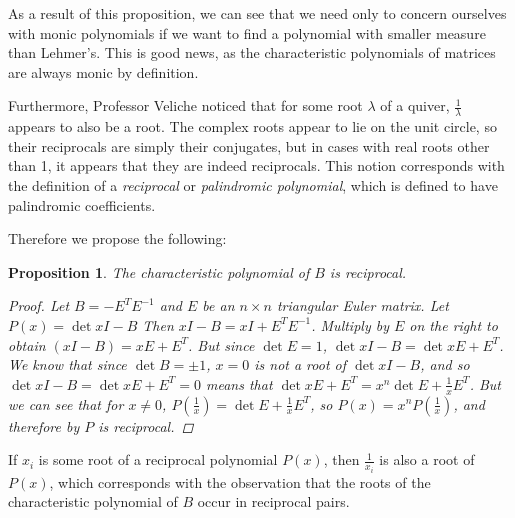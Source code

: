 \documentclass{amsart}
\theoremstyle{theorem}
\theoremstyle{theorem*}
\newtheorem{proposition}[theorem]{Proposition}
\theoremstyle{definition}
\begin{document}
As a result of this proposition, we can see that we need only to concern ourselves with monic polynomials if we
want to find a polynomial with smaller measure than Lehmer's. This is good news, as the characteristic polynomials
of matrices are always monic by definition.

Furthermore, Professor Veliche noticed that for some root $\lambda$ of a quiver,
$\frac{1}{\lambda}$ appears to also be a root. The complex roots appear to lie on
the unit circle, so their reciprocals are simply their conjugates, but in cases with
real roots other than 1, it appears that they are indeed reciprocals. This notion
corresponds with the definition of a \textit{reciprocal} or \textit{palindromic polynomial}, 
which is defined to have palindromic coefficients. 

Therefore we propose the following:

\begin{proposition}
    The characteristic polynomial of $B$ is reciprocal.
    \begin{proof}
        Let $B = - E^T E^{-1}$ and $E$ be an $n \times n$ triangular Euler matrix. Let $P(x) = \det{xI - B}$
        Then $xI - B = xI + E^T E^{-1}$. Multiply by $E$ on the right to obtain
        $(xI - B) = xE + E^T$. But since $\det{E} = 1$, $\det{xI - B} = \det{xE + E^T}$.
        We know that since $\det{B} = \pm 1$, $x = 0$ is not a root of $\det{xI - B}$,
        and so $\det{xI - B} = \det{xE + E^T} = 0$ means that 
        $\det{xE+E^T} = x^n \det{E + \frac{1}{x} E^T}$. But we can see that for $x \neq 0$,
        $P(\frac{1}{x}) = \det{E + \frac{1}{x} E^T}$, so $P(x) = x^n P(\frac{1}{x})$,
        and therefore by \cite{syz}  $P$ is reciprocal.
    \end{proof}
\end{proposition}

If $x_i$ is some root of a reciprocal polynomial $P(x)$, 
then $\frac{1}{x_i}$ is also a root of $P(x)$, which corresponds with the observation
that the roots of the characteristic polynomial of $B$ occur in reciprocal pairs.
\end{document}
